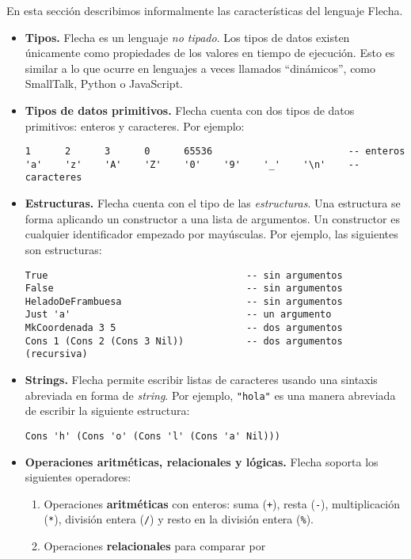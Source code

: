 \documentclass{article}
\newcommand{\flecha}{\textsf{Flecha}\xspace}
\newcommand{\fl}[1]{\texttt{#1}}
\begin{document}
En esta sección describimos informalmente las características del lenguaje \flecha.
\begin{itemize}
\item {\bf Tipos.}
      \flecha es un lenguaje {\em no tipado}.
      Los tipos de datos existen únicamente como propiedades de los
      valores en tiempo de ejecución. Esto es similar a lo que
      ocurre en lenguajes a veces llamados ``dinámicos'', como
      SmallTalk, Python o JavaScript.
\item {\bf Tipos de datos primitivos.}
      \flecha cuenta con dos tipos de datos primitivos:
      enteros y caracteres. Por ejemplo:
\begin{verbatim}
1      2      3      0      65536                        -- enteros
'a'    'z'    'A'    'Z'    '0'    '9'    '_'    '\n'    -- caracteres
\end{verbatim}
\item {\bf Estructuras.}
      \flecha cuenta con el tipo de las {\em estructuras}.
      Una estructura se forma aplicando un constructor a una lista
      de argumentos. Un constructor es cualquier identificador empezado
      por mayúsculas. Por ejemplo, las siguientes son estructuras:
\begin{verbatim}
True                                   -- sin argumentos
False                                  -- sin argumentos
HeladoDeFrambuesa                      -- sin argumentos
Just 'a'                               -- un argumento
MkCoordenada 3 5                       -- dos argumentos
Cons 1 (Cons 2 (Cons 3 Nil))           -- dos argumentos (recursiva)
\end{verbatim}
\item {\bf Strings.}
      \flecha permite escribir listas de caracteres usando una sintaxis
      abreviada en forma de {\em string}. Por ejemplo,
      \fl{"hola"} es una manera abreviada de escribir
      la siguiente estructura:
\begin{verbatim}
Cons 'h' (Cons 'o' (Cons 'l' (Cons 'a' Nil)))
\end{verbatim}
\item {\bf Operaciones aritméticas, relacionales y lógicas.}
  \flecha soporta los siguientes operadores:
  \begin{enumerate}
  \item Operaciones {\bf aritméticas} con enteros: suma (\fl{+}),
        resta (\fl{-}), multiplicación (\fl{*}), división entera (\fl{/})
        y resto en la división entera (\!\texttt{\%}).
  \item Operaciones {\bf relacionales} para comparar por

\end{enumerate}
\end{itemize}
\end{document}
